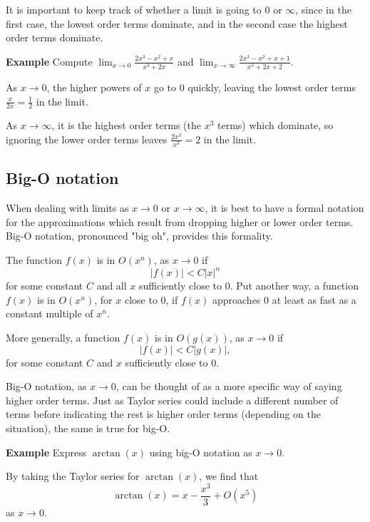 \documentclass[twoside,openright,titlepage,a4paper]{book}
\begin{document}
\begin{sloppypar}
It is important to keep track of whether a limit is going to 0 or $\infty$, since in the first case, the lowest order terms dominate, and in the second case the highest order terms dominate.

\textbf{Example} Compute $\displaystyle \lim_{x \rightarrow 0} \frac{2x^3-x^2+x}{x^3+2x}$ and $\displaystyle \lim_{x \rightarrow \infty} \frac{2x^3-x^2+x+1}{x^3+2x+2}$.
\begin{examplebox}
As $x \rightarrow 0$, the higher powers of $x$ go to 0 quickly, leaving the lowest order terms $\frac{x}{2x} = \frac{1}{2}$ in the limit.

As $x \rightarrow \infty$, it is the highest order terms (the $x^3$ terms) which dominate, so ignoring the lower order terms leaves $\frac{2x^3}{x^3} = 2$ in the limit.
\end{examplebox}

\subsection{Big-O notation}
When dealing with limits as $x \rightarrow 0$ or $x \rightarrow \infty$, it is best to have a formal notation for the approximations which result from dropping higher or lower order terms. Big-O notation, pronounced "big oh", provides this formality.

\begin{definitionbox}[title=\textbf{Big-O notation, $x \rightarrow 0$}]
The function $f(x)$ is in $O(x^n)$, as $x \rightarrow 0$ if \[ |f(x)| < C|x|^n \] for some constant $C$ and all $x$ sufficiently close to 0. Put another way, a function $f(x)$ is in $O(x^n)$, for $x$ close to 0, if $f(x)$ approaches 0 at least as fast as a constant multiple of $x^n$.

More generally, a function $f(x)$ is in $O(g(x))$, as $x \rightarrow 0$ if \[ |f(x)| < C|g(x)|, \] for some constant $C$ and $x$ sufficiently close to 0.
\end{definitionbox}

Big-O notation, as $x \rightarrow 0$, can be thought of as a more specific way of saying higher order terms. Just as Taylor series could include a different number of terms before indicating the rest is higher order terms (depending on the situation), the same is true for big-O.

\textbf{Example} Express $\arctan(x)$ using big-O notation as $x \rightarrow 0$. 
\begin{examplebox}
By taking the Taylor series for $\arctan(x)$, we find that \[ \arctan(x)= x - \frac{x^3}{3} + O(x^5) \] as $x \rightarrow 0$.


\end{examplebox}
\end{sloppypar}
\end{document}

